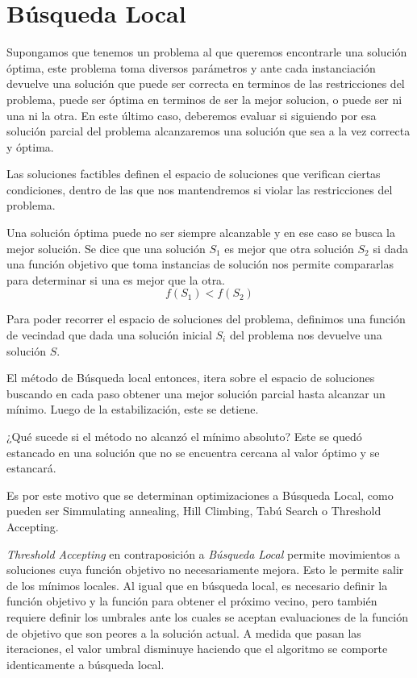 \documentclass[a4paper,spanish]{article}
\begin{document}
\section{Búsqueda Local}

Supongamos que tenemos un problema al que queremos encontrarle una solución
óptima, este problema toma diversos parámetros y ante cada instanciación
devuelve una solución que puede ser correcta en terminos de las restricciones
del problema, puede ser óptima en terminos de ser la mejor solucion, o puede ser
ni una ni la otra. En este último caso, deberemos evaluar si siguiendo por esa
solución parcial del problema alcanzaremos una solución que sea a la vez
correcta y óptima.

Las soluciones factibles definen el espacio de soluciones que verifican ciertas
condiciones, dentro de las que nos mantendremos si violar las restricciones del
problema.

Una solución óptima puede no ser siempre alcanzable y en ese caso se busca la
mejor solución. Se dice que una solución $S_1$ es mejor que otra solución $S_2$ si
dada una función objetivo  que toma instancias de solución nos permite
compararlas para determinar si una es mejor que la otra.
\begin{equation}
    f(S_1) < f(S_2) 
\end{equation}

Para poder recorrer el espacio de soluciones del problema, definimos una función
de vecindad que dada una solución inicial $S_i$ del problema nos devuelve una
solución $S$.


El método de Búsqueda local entonces, itera sobre el espacio de soluciones
buscando en cada paso obtener una mejor solución parcial hasta alcanzar un
mínimo. Luego de la estabilización, este se detiene.

¿Qué sucede si el método no alcanzó el mínimo absoluto? Este se quedó estancado
en una solución que no se encuentra cercana al valor óptimo y se estancará.

Es por este motivo que se determinan optimizaciones a Búsqueda Local, como
pueden ser Simmulating annealing, Hill Climbing, Tabú Search o Threshold
Accepting.

\emph{Threshold Accepting} en contraposición a \emph{Búsqueda Local} permite
movimientos a soluciones cuya función objetivo no necesariamente mejora. Esto le
permite salir de los mínimos locales. Al igual que en búsqueda local, es
necesario definir la función objetivo y la función para obtener el próximo
vecino, pero también requiere definir los umbrales ante los cuales se aceptan
evaluaciones de la función de objetivo que son peores a la solución actual.
A medida que pasan las iteraciones, el valor umbral disminuye haciendo que el
algoritmo se comporte identicamente a búsqueda local.
\end{document}
